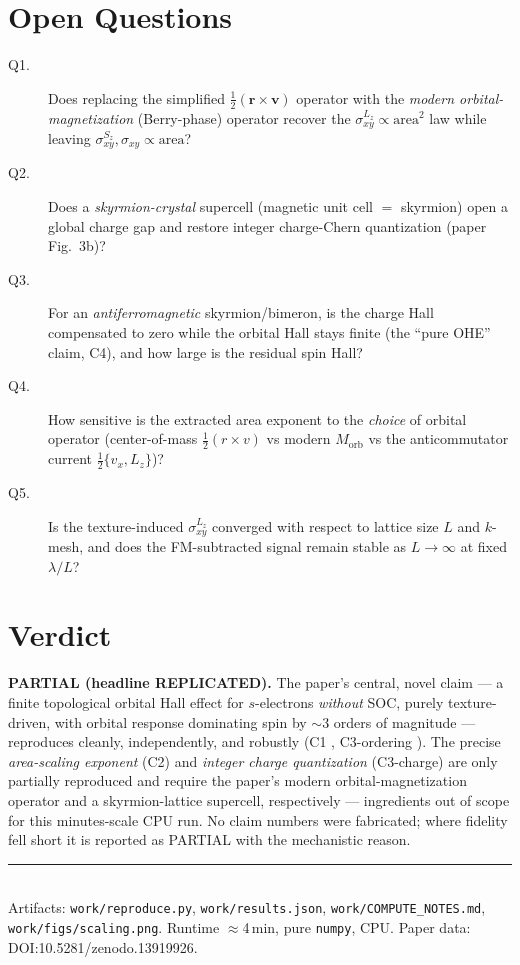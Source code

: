 \documentclass[11pt]{article}
\newcommand{\sigLz}{\sigma^{L_z}_{xy}}
\newcommand{\sigSz}{\sigma^{S_z}_{xy}}
\newcommand{\sigC}{\sigma_{xy}}
\begin{document}
\section{Open Questions}
\begin{description}
  \item[Q1.] Does replacing the simplified $\tfrac12(\mathbf r\times\mathbf v)$ operator
  with the \emph{modern orbital-magnetization} (Berry-phase) operator recover the
  $\sigLz\propto\text{area}^2$ law while leaving $\sigSz,\sigC\propto\text{area}$?
  \item[Q2.] Does a \emph{skyrmion-crystal} supercell (magnetic unit cell $=$ skyrmion)
  open a global charge gap and restore integer charge-Chern quantization (paper Fig.~3b)?
  \item[Q3.] For an \emph{antiferromagnetic} skyrmion/bimeron, is the charge Hall
  compensated to zero while the orbital Hall stays finite (the ``pure OHE'' claim, C4),
  and how large is the residual spin Hall?
  \item[Q4.] How sensitive is the extracted area exponent to the \emph{choice} of orbital
  operator (center-of-mass $\tfrac12(r\times v)$ vs modern $M_\mathrm{orb}$ vs the
  anticommutator current $\tfrac12\{v_x,L_z\}$)?
  \item[Q5.] Is the texture-induced $\sigLz$ converged with respect to lattice size $L$ and
  $k$-mesh, and does the FM-subtracted signal remain stable as $L\to\infty$ at fixed
  $\lambda/L$?
\end{description}

\section*{Verdict}
\textbf{PARTIAL (headline REPLICATED).} The paper's central, novel claim --- a finite
topological orbital Hall effect for $s$-electrons \emph{without} SOC, purely texture-driven,
with orbital response dominating spin by $\sim$3 orders of magnitude --- reproduces cleanly,
independently, and robustly (C1 \checkmark, C3-ordering \checkmark). The precise
\emph{area-scaling exponent} (C2) and \emph{integer charge quantization} (C3-charge) are
only partially reproduced and require the paper's modern orbital-magnetization operator and
a skyrmion-lattice supercell, respectively --- ingredients out of scope for this
minutes-scale CPU run. No claim numbers were fabricated; where fidelity fell short it is
reported as PARTIAL with the mechanistic reason.

\vspace{1em}
\noindent\rule{\textwidth}{0.4pt}\\
\footnotesize
Artifacts: \texttt{work/reproduce.py}, \texttt{work/results.json},
\texttt{work/COMPUTE\_NOTES.md}, \texttt{work/figs/scaling.png}. Runtime $\approx$4\,min,
pure \texttt{numpy}, CPU. Paper data: DOI:10.5281/zenodo.13919926.
\end{document}
